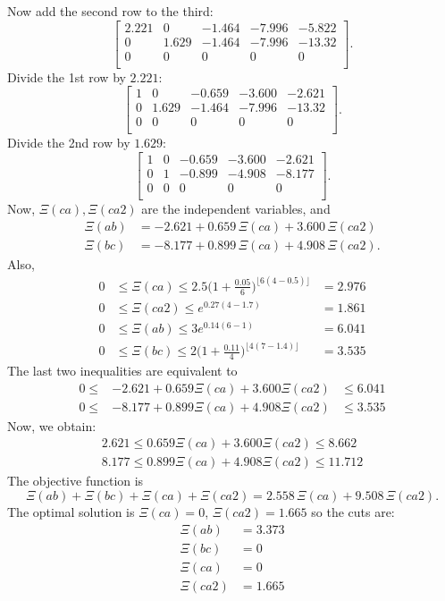 \documentclass[10pt]{article}
\begin{document}
Now add the second row to the third:
\[
\begin{bmatrix}
2.221 & 0 & -1.464 & -7.996 & -5.822 \\
0 & 1.629 & -1.464 & -7.996 & -13.32 \\
0 & 0 & 0 & 0 & 0 \\
\end{bmatrix}.
\]
Divide the 1st row by $2.221$:
\[
\begin{bmatrix}
1 & 0 & -0.659 & -3.600 & -2.621 \\
0 & 1.629 & -1.464 & -7.996 & -13.32 \\
0 & 0 & 0 & 0 & 0 \\
\end{bmatrix}.
\]
Divide the 2nd row by $1.629$:
\[
\begin{bmatrix}
1 & 0 & -0.659 & -3.600 & -2.621 \\
0 & 1 & -0.899 & -4.908 & -8.177 \\
0 & 0 & 0 & 0 & 0 \\
\end{bmatrix}.
\]
Now, $\Xi(ca), \Xi(ca2)$ are the independent variables, and 
\begin{align*}
\Xi(ab) &= -2.621 + 0.659 \, \Xi(ca) + 3.600 \, \Xi(ca2) \\
\Xi(bc) &= -8.177 + 0.899 \, \Xi(ca) + 4.908 \, \Xi(ca2).
\end{align*}
Also,
\begin{align*}
0 & \leq \Xi(ca) \leq 2.5 \Big( 1 + \frac{0.05}{6} \Big)^{ \lfloor 6 (4 - 0.5) \rfloor } & = 2.976 \\
0 & \leq \Xi(ca2) \leq e^{0.27 (4 - 1.7)} & = 1.861 \\
0 & \leq \Xi(ab) \leq 3e^{0.14(6 - 1)} &= 6.041 \\
0 & \leq \Xi(bc) \leq 2 \Big( 1 + \frac{0.11}{4} \Big)^{ \lfloor 4(7 - 1.4) \rfloor } &= 3.535
\end{align*}
The last two inequalities are equivalent to 
\begin{align*}
0 \leq & -2.621 + 0.659 \Xi(ca) +3.600 \Xi(ca2) & \leq 6.041 \\
0 \leq & -8.177 + 0.899 \Xi(ca) + 4.908 \Xi(ca2) & \leq 3.535
\end{align*}
Now, we obtain:
\begin{align*}
2.621 \leq 0.659 \Xi(ca) + 3.600 \Xi(ca2) \leq 8.662 \\
8.177 \leq 0.899 \Xi(ca) + 4.908 \Xi(ca2) \leq 11.712
\end{align*}
The objective function is 
\[
\Xi(ab) + \Xi(bc) + \Xi(ca) + \Xi(ca2) = 2.558 \, \Xi(ca) + 9.508 \, \Xi(ca2).
\]
The optimal solution is $\Xi(ca) = 0$, $\Xi(ca2) = 1.665$ so the cuts are:
\begin{align*}
\Xi(ab) &= 3.373\\
\Xi(bc) &= 0\\
\Xi(ca) &= 0\\
\Xi(ca2) &= 1.665
\end{align*}
\end{document}
